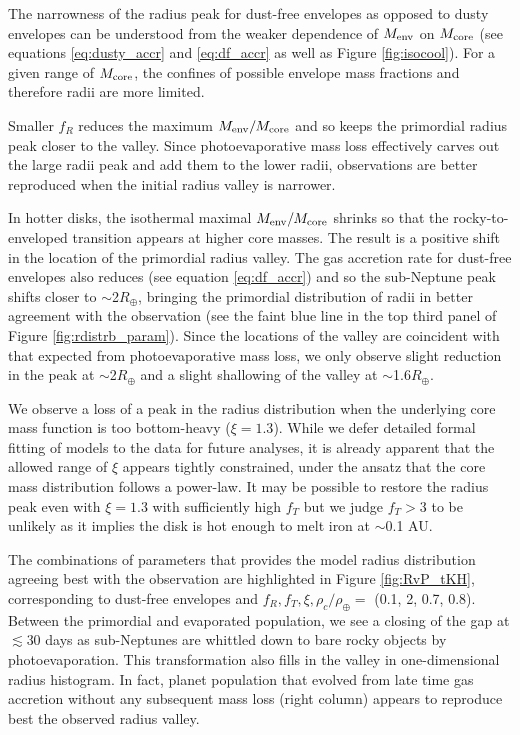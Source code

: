 \documentclass[twocolumn]{aastex63}
\begin{document}
The narrowness of the radius peak for dust-free envelopes as opposed to dusty envelopes can be understood from the weaker dependence of $M_{\rm env}$ on $M_{\rm core}$ (see equations \ref{eq:dusty_accr} and \ref{eq:df_accr} as well as Figure \ref{fig:isocool}). For a given range of $M_{\rm core}$, the confines of possible envelope mass fractions and therefore radii are more limited. 

Smaller $f_R$ reduces the maximum $M_{\rm env}/M_{\rm core}$ and so keeps the primordial radius peak closer to the valley. Since photoevaporative mass loss effectively carves out the large radii peak and add them to the lower radii, observations are better reproduced when the initial radius valley is narrower.

In hotter disks, the isothermal maximal $M_{\rm env}/M_{\rm core}$ shrinks so that the rocky-to-enveloped transition appears at higher core masses. The result is a positive shift in the location of the primordial radius valley. The gas accretion rate for dust-free envelopes also reduces (see equation \ref{eq:df_accr}) and so the sub-Neptune peak shifts closer to $\sim$2$R_\oplus$, bringing the primordial distribution of radii in better agreement with the observation (see the faint blue line in the top third panel of Figure \ref{fig:rdistrb_param}). Since the locations of the valley are coincident with that expected from photoevaporative mass loss, we only observe slight reduction in the peak at $\sim$2$R_\oplus$ and a slight shallowing of the valley at $\sim$1.6$R_\oplus$.

We observe a loss of a peak in the radius distribution when the underlying core mass function is too bottom-heavy ($\xi = 1.3$). While we defer detailed formal fitting of models to the data for future analyses, it is already apparent that the allowed range of $\xi$ appears tightly constrained, under the ansatz that the core mass distribution follows a power-law. It may be possible to restore the radius peak even with $\xi=1.3$ with sufficiently high $f_T$ but we judge $f_T > 3$ to be unlikely as it implies the disk is hot enough to melt iron at $\sim$0.1 AU.

The combinations of parameters that provides the model radius distribution agreeing best with the observation are highlighted in Figure \ref{fig:RvP_tKH}, corresponding to dust-free envelopes and $f_R, f_T, \xi, \rho_c/\rho_\oplus =$ (0.1, 2, 0.7, 0.8). Between the primordial and evaporated population, we see a closing of the gap at $\lesssim$30 days as sub-Neptunes are whittled down to bare rocky objects by photoevaporation. This transformation also fills in the valley in one-dimensional radius histogram. In fact, planet population that evolved from late time gas accretion without any subsequent mass loss (right column) appears to reproduce best the observed radius valley.
\end{document}
